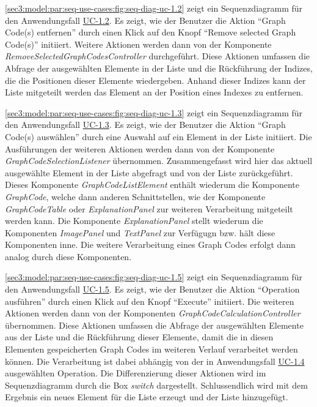 

\cref{sec3:model:par:seq-use-cases:fig:seq-diag-uc-1.2} zeigt ein Sequenzdiagramm für den Anwendungsfall \hyperref[sec3:model:uc-1.2]{UC-1.2}.
Es zeigt, wie der Benutzer die Aktion \enquote{Graph Code(s) entfernen} durch einen Klick auf den Knopf \enquote{Remove selected Graph Code(s)} initiiert.
Weitere Aktionen werden dann von der Komponente \textit{RemoveSelectedGraphCodesController} durchgeführt.
Diese Aktionen umfassen die Abfrage der ausgewählten Elemente in der Liste und die Rückführung der Indizes, die die Positionen dieser Elemente wiedergeben.
Anhand dieser Indizes kann der Liste mitgeteilt werden das Element an der Position eines Indexes zu entfernen.



\cref{sec3:model:par:seq-use-cases:fig:seq-diag-uc-1.3} zeigt ein Sequenzdiagramm für den Anwendungsfall \hyperref[sec3:model:uc-1.3]{UC-1.3}.
Es zeigt, wie der Benutzer die Aktion \enquote{Graph Code(s) auswählen} durch eine Auswahl auf ein Element in der Liste initiiert.
Die Ausführungen der weiteren Aktionen werden dann von der Komponente \textit{GraphCodeSelectionListener} übernommen.
Zusammengefasst wird hier das aktuell ausgewählte Element in der Liste abgefragt und von der Liste zurückgeführt.
Dieses Komponente \textit{GraphCodeListElement} enthält wiederum die Komponente \textit{GraphCode}, welche dann anderen Schnittstellen, wie der Komponente \textit{GraphCodeTable} oder \textit{ExplanationPanel} zur weiteren Verarbeitung mitgeteilt werden kann.
Die Komponente \textit{ExplanationPanel} stellt wiederum die Komponenten \textit{ImagePanel} und \textit{TextPanel} zur Verfügugn bzw. hält diese Komponenten inne.
Die weitere Verarbeitung eines Graph Codes erfolgt dann analog durch diese Komponenten.



\cref{sec3:model:par:seq-use-cases:fig:seq-diag-uc-1.5} zeigt ein Sequenzdiagramm für den Anwendungsfall \hyperref[sec3:model:uc-1.5]{UC-1.5}.
Es zeigt, wie der Benutzer die Aktion \enquote{Operation ausführen} durch einen Klick auf den Knopf \enquote{Execute} initiiert.
Die weiteren Aktionen werden dann von der Komponenten \textit{GraphCodeCalculationController} übernommen.
Diese Aktionen umfassen die Abfrage der ausgewählten Elemente aus der Liste und die Rückführung dieser Elemente, damit die in diesen Elementen gespeicherten Graph Codes im weiteren Verlauf verarbeitet werden können.
Die Verarbeitung ist dabei abhängig von der in Anwendungsfall \hyperref[sec3:model:uc-1.4]{UC-1.4} ausgewählten Operation.
Die Differenzierung dieser Aktionen wird im Sequenzdiagramm durch die Box \textit{switch} dargestellt.
Schlussendlich wird mit dem Ergebnis ein neues Element für die Liste erzeugt und der Liste hinzugefügt.

